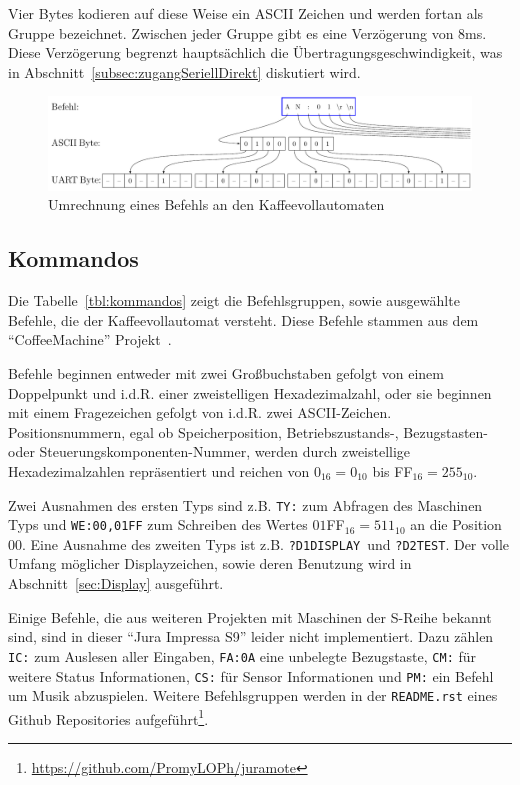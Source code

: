 Vier Bytes kodieren auf diese Weise ein \ac{ASCII} Zeichen und werden fortan als Gruppe bezeichnet.
Zwischen jeder Gruppe gibt es eine Verzögerung von 8ms.
Diese Verzögerung begrenzt hauptsächlich die Übertragungsgeschwindigkeit, was in Abschnitt~\ref{subsec:zugangSeriellDirekt} diskutiert wird.

\begin{figure}
  \begin{center}
    \includegraphics[scale=0.6]{images/chapter_3/UART-Bytes}
    \caption{Umrechnung eines Befehls an den Kaffeevollautomaten}
    \label{fig:uart}
  \end{center}
\end{figure}

\subsection{Kommandos}\label{subsec:Kommandos}
Die Tabelle~\ref{tbl:kommandos} zeigt die Befehlsgruppen, sowie ausgewählte Befehle, die der Kaffeevollautomat versteht.
Diese Befehle stammen aus dem "`CoffeeMachine"' Projekt~\cite{GitCoffeeMachine}.

Befehle beginnen entweder mit zwei Großbuchstaben gefolgt von einem Doppelpunkt und i.d.R. einer zweistelligen Hexadezimalzahl, oder sie beginnen mit einem Fragezeichen gefolgt von i.d.R. zwei \ac{ASCII}-Zeichen.
Positionsnummern, egal ob Speicherposition, \mbox{Betriebszustands-,} Bezugstasten- oder Steuerungskomponenten-Nummer, werden durch zweistellige Hexadezimalzahlen repräsentiert und reichen von $0_{16}=0_{10}$ bis FF$_{16}=255_{10}$.

Zwei Ausnahmen des ersten Typs sind z.B. \texttt{TY:} zum Abfragen des Maschinen Typs und \texttt{WE:00,01FF} zum Schreiben des Wertes $01$FF$_{16} = 511_{10}$ an die Position $00$.
Eine Ausnahme des zweiten Typs ist z.B. \texttt{?D1DISPLAY}\textvisiblespace\ und \texttt{?D2}\textvisiblespace\textvisiblespace\texttt{TEST}\textvisiblespace\textvisiblespace.
Der volle Umfang möglicher Displayzeichen, sowie deren Benutzung wird in Abschnitt~\ref{sec:Display} ausgeführt.

Einige Befehle, die aus weiteren Projekten mit Maschinen der S-Reihe bekannt sind, sind in dieser "`Jura Impressa S9"' leider nicht implementiert.
Dazu zählen \texttt{IC:} zum Auslesen aller Eingaben, \texttt{FA:0A} eine unbelegte Bezugstaste, \texttt{CM:} für weitere Status Informationen, \texttt{CS:} für Sensor Informationen und \texttt{PM:} ein Befehl um Musik abzuspielen.
Weitere Befehlsgruppen werden in der \texttt{README.rst} eines Github Repositories aufgeführt\footnote{\url{https://github.com/PromyLOPh/juramote}}.

